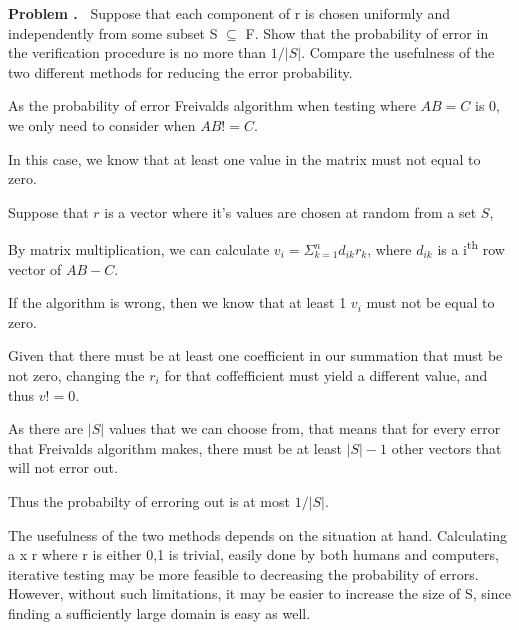 \documentclass[a4paper,12pt]{article}
\newcommand{\collaborators}[1]{\def\collaboratorsdata{#1}}
\def\collaboratorsdata{\relax}
\newcommand{\addbigskip}{\addvspace{2\bigskipamount}}
\newcommand{\nline}{\bigskip}
\newcounter{problemnum}
\newenvironment{problem}
  {\addbigskip \setcounter{partnum}{0}
   \noindent\stepcounter{problemnum}\textbf{Problem \arabic{problemnum}.\ }}
  {\par\addbigskip}
\newcounter{partnum}
\newenvironment{answer}
{\begin{lrbox}{\mybox}\begin{minipage}{0.95\textwidth}\vspace{0.2cm}}
  {\vspace{0.1cm}\end{minipage}\end{lrbox}\fbox{\usebox{\mybox}}}
\begin{document}
\collaborators{None} %
\begin{problem}
    Suppose that each component of r is chosen uniformly and independently from some subset S $\subseteq$ F. 
    Show that the probability of error in the verification procedure is no more than $1/|S|$. Compare the usefulness of the two different methods for reducing the error probability.
    
    \begin{answer}
        As the probability of error Freivalds algorithm when testing where $AB = C$ is 0, we only need to consider when $AB != C$.

        \nline

        In this case, we know that at least one value in the matrix must not equal to zero.
        
        \nline

        Suppose that $r$ is a vector where it's values are chosen at random from a set $S$,

        By matrix multiplication, we can calculate $v_i = \Sigma_{k=1}^{n} d_{ik} r_k$, where $d_{ik}$ is a i\textsuperscript{th} row vector of $AB - C$.

        If the algorithm is wrong, then we know that at least 1 $v_i$ must not be equal to zero.
        
        Given that there must be at least one coefficient in our summation that must be not zero, changing the $r_i$ for that coffefficient must yield a different value, and thus $v != 0$. 
        
        As there are $|S|$ values that we can choose from, that means that for every error that Freivalds algorithm makes, there must be at least $|S| - 1$ other vectors that will not error out. 
        
        Thus the probabilty of erroring out is at most $1/|S|$.

        \nline

        The usefulness of the two methods depends on the situation at hand. Calculating a x r where r is either 0,1 is trivial, easily done by both humans and computers, iterative testing may be more feasible to decreasing the probability of errors. However, without such limitations, it may be easier to increase the size of S, since finding a sufficiently large domain is easy as well.
    \end{answer}
\end{problem}

\newpage
\end{document}
